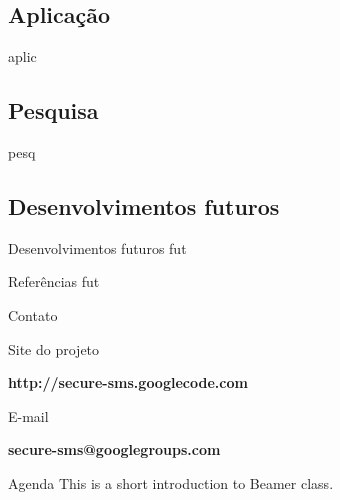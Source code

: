 \documentclass[notes,blue,mathserif]{beamer}
\begin{document}
\subsection{Aplica\c{c}\~{a}o}
\begin{frame}
aplic
\end{frame}

\subsection{Pesquisa}
\begin{frame}
pesq
\end{frame}

\subsection{Desenvolvimentos futuros}
\begin{frame}{Desenvolvimentos futuros}
fut
\end{frame}

\begin{frame}{Refer\^{e}ncias}
fut
\end{frame}

\begin{frame}{Contato}

	\begin{exampleblock}{Site do projeto}
		\begin{center}
		\begin{large}

		\textbf{http://secure-sms.googlecode.com}

		\end{large}
		\end{center}
	\end{exampleblock}

	\begin{exampleblock}{E-mail}
		\begin{center}
		\begin{large}

		\textbf{secure-sms@googlegroups.com}

		\end{large}
		\end{center}
	\end{exampleblock}

\end{frame}






\begin{frame}{Agenda}
This is a short introduction to Beamer class.
\end{frame}
\end{document}
